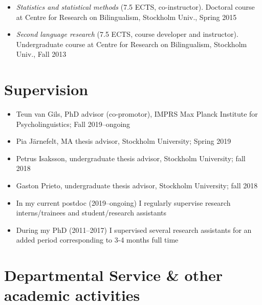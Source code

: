 \documentclass[margin, 11pt]{res} %
\begin{document}
\begin{resume}
\begin{itemize}
\item \textit{Statistics and statistical methods} (7.5 ECTS, co-instructor). Doctoral course at Centre for Research on Bilingualism, Stockholm Univ., Spring 2015

\item \textit{Second language research} (7.5 ECTS, course developer and instructor). Undergraduate course at Centre for Research on Bilingualism, Stockholm Univ., Fall 2013 

\end{itemize}


\section{\sc Supervision}

\begin{itemize}

\item Teun van Gils, PhD advisor (co-promotor), IMPRS Max Planck Institute for Psycholinguistics; Fall 2019--ongoing

\item Pia J{\"a}rnefelt, MA thesis advisor, Stockholm University; Spring 2019

\item Petrus Isaksson, undergraduate thesis advisor, Stockholm University; fall 2018

\item Gaston Prieto, undergraduate thesis advisor, Stockholm University; fall 2018

\item In my current postdoc (2019--ongoing) I regularly supervise research interns/trainees and student/research assistants

\item During my PhD (2011--2017) I supervised several research assistants for an added period corresponding to 3-4 months full time

\end{itemize}



\section{\sc Departmental Service \& other academic activities}


\end{resume}
\end{document}
